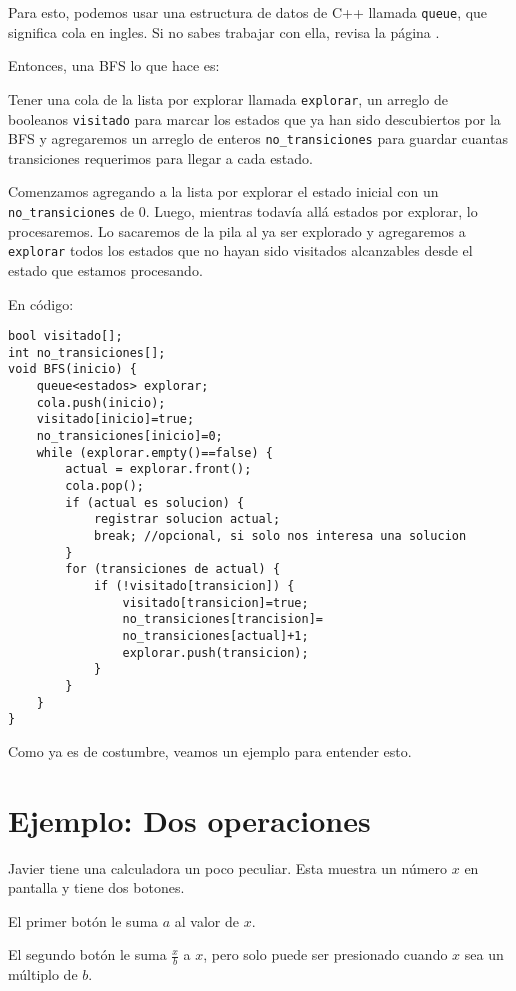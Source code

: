 Para esto, podemos usar una estructura de datos de C++ llamada \verb|queue|, que significa cola en ingles. Si no sabes trabajar con ella, revisa la página \pageref{queue}.

Entonces, una BFS lo que hace es:

Tener una cola de la lista por explorar llamada \verb|explorar|, un arreglo de booleanos \verb|visitado| para marcar los estados que ya han sido descubiertos por la BFS y agregaremos un arreglo de enteros \verb|no_transiciones| para guardar cuantas transiciones requerimos para llegar a cada estado.

Comenzamos agregando a la lista por explorar el estado inicial con un \verb|no_transiciones| de \(0\). Luego, mientras todavía allá estados por explorar, lo procesaremos. Lo sacaremos de la pila al ya ser explorado y agregaremos a \verb|explorar| todos los estados que no hayan sido visitados alcanzables desde el estado que estamos procesando.

En código:

\begin{minipage}{\linewidth}
\begin{lstlisting}
bool visitado[];
int no_transiciones[];
void BFS(inicio) {
	queue<estados> explorar;
	cola.push(inicio);
	visitado[inicio]=true;
	no_transiciones[inicio]=0;
	while (explorar.empty()==false) {
		actual = explorar.front();
		cola.pop();
		if (actual es solucion) {
			registrar solucion actual;
			break; //opcional, si solo nos interesa una solucion
		}
		for (transiciones de actual) {
			if (!visitado[transicion]) {
				visitado[transicion]=true;
				no_transiciones[trancision]=
				no_transiciones[actual]+1;
				explorar.push(transicion);
			}
		}
	}
}
\end{lstlisting}
\end{minipage}

Como ya es de costumbre, veamos un ejemplo para entender esto.
\section{Ejemplo: Dos operaciones}
Javier tiene una calculadora un poco peculiar. Esta muestra un número \(x\) en pantalla y tiene dos botones.

\begin{plimits}
	\item El primer botón le suma \(a\) al valor de \(x\).
	\item El segundo botón le  suma \(\frac{x}{b}\) a \(x\), pero solo puede ser presionado cuando \(x\) sea un múltiplo de \(b\).
\end{plimits}

